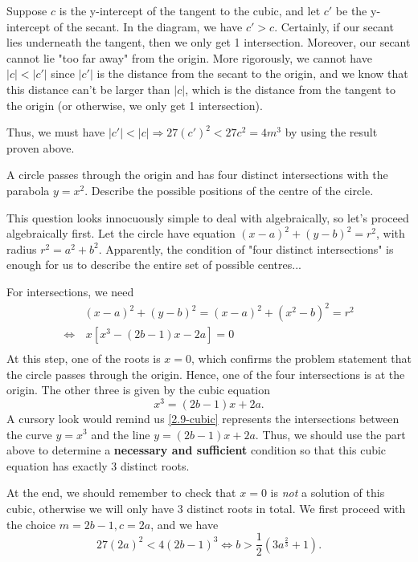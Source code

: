 \documentclass[../jarvis.tex]{subfiles}
\begin{document}
Suppose $c$ is the y-intercept of the tangent to the cubic, and let $c'$ be the y-intercept of the secant. In the diagram, we have $c' > c$. Certainly, if our secant lies underneath the tangent, then we only get 1 intersection. Moreover, our secant cannot lie "too far away" from the origin. More rigorously, we cannot have $|c|<|c'|$ since $|c'|$ is the distance from the secant to the origin, and we know that this distance can't be larger than $|c|$, which is the distance from the tangent to the origin (or otherwise, we only get 1 intersection).

Thus, we must have $|c'|<|c| \Longrightarrow 27(c')^2 < 27c^2 = 4m^3$ by using the result proven above.

\begin{example}[cont..]
A circle passes through the origin and has four distinct intersections with the parabola $y=x^2$. Describe the possible positions of the centre of the circle.
\end{example}
This question looks innocuously simple to deal with algebraically, so let's proceed algebraically first. Let the circle have equation $(x-a)^2+(y-b)^2=r^2$, with radius $r^2=a^2+b^2$. Apparently, the condition of "four distinct intersections" is enough for us to describe the entire set of possible centres...

For intersections, we need
\begin{align*}
    &(x-a)^2+(y-b)^2 =(x-a)^2+(x^2-b)^2=r^2 \\
    \Longleftrightarrow& \,x\left[x^3-(2b-1)x-2a\right]=0\\
\end{align*}
At this step, one of the roots is $x=0$, which confirms the problem statement that the circle passes through the origin. Hence, one of the four intersections is at the origin. The other three is given by the cubic equation 
\begin{equation}\label{2.9-cubic}
    x^3=(2b-1)x+2a.
\end{equation} A cursory look would remind us \eqref{2.9-cubic} represents the intersections between the curve $y=x^3$ and the line $y=(2b-1)x+2a$. Thus, we should use the part above to determine a \textbf{necessary and sufficient} condition so that this cubic equation has exactly 3 distinct roots.

At the end, we should remember to check that $x=0$ is \textit{not} a solution of this cubic, otherwise we will only have 3 distinct roots in total. We first proceed with the choice $m=2b-1, c=2a$, and we have $$27(2a)^2 < 4(2b-1)^3 \Longleftrightarrow b > \frac{1}{2}\left(3a^{\frac{2}{3}}+1\right).$$
\end{document}
